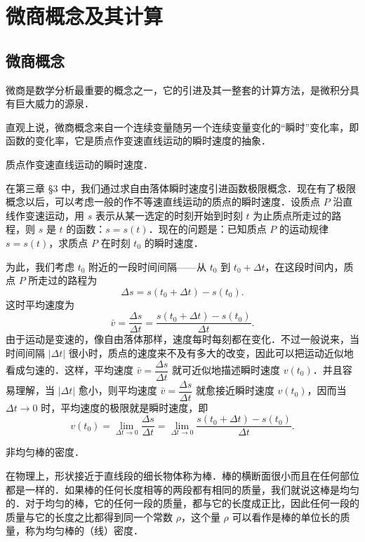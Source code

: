 \section{微商概念及其计算}\label{sec:4.1}

\subsection{微商概念}

微商是数学分析最重要的概念之一，它的引进及其一整套的计算方法，是微积分具有巨大威力的源泉．

直观上说，微商概念来自一个连续变量随另一个连续变量变化的``瞬时''变化率，即函数的变化率，它是质点作变速直线运动的瞬时速度的抽象．

\begin{example}\label{ex:4-1-1}
质点作变速直线运动的瞬时速度．
\end{example}

在第三章 §3 中，我们通过求自由落体瞬时速度引进函数极限概念．现在有了极限概念以后，可以考虑一般的作不等速直线运动的质点的瞬时速度．设质点 $P$ 沿直线作变速运动，用 $s$ 表示从某一选定的时刻开始到时刻 $t$ 为止质点所走过的路程，则 $s$ 是 $t$ 的函数：$s = s(t)$．现在的问题是：已知质点 $P$ 的运动规律 $s = s(t)$，求质点 $P$ 在时刻 $t_0$ 的瞬时速度．

为此，我们考虑 $t_0$ 附近的一段时间间隔——从 $t_0$ 到 $t_0 + \Delta t$，在这段时间内，质点 $P$ 所走过的路程为
\[
\Delta s = s\left(t_0+\Delta t\right) - s\left(t_0\right).
\]
这时平均速度为
\[
\bar{v} = \frac{\Delta s}{\Delta t} = \frac{s\left(t_0+\Delta t\right) - s\left(t_0\right)}{\Delta t}.
\]
由于运动是变速的，像自由落体那样，速度每时每刻都在变化．不过一般说来，当时间间隔 $\left|\Delta t\right|$ 很小时，质点的速度来不及有多大的改变，因此可以把运动近似地看成匀速的．这样，平均速度 $\bar{v} = \dfrac{\Delta s}{\Delta t}$ 就可近似地描述瞬时速度 $v(t_0)$．并且容易理解，当 $\left|\Delta t\right|$ 愈小，则平均速度 $\bar{v} = \dfrac{\Delta s}{\Delta t}$ 就愈接近瞬时速度 $v(t_0)$，因而当 $\Delta t \to 0$ 时，平均速度的极限就是瞬时速度，即
\[
v\left(t_0\right) = \lim_{\Delta t\to 0}\frac{\Delta s}{\Delta t} = \lim_{\Delta t\to 0}\frac{s\left(t_0+\Delta t\right) - s\left(t_0\right)}{\Delta t}.
\]

\begin{example}\label{ex:4-1-2}
非均匀棒的密度．
\end{example}

在物理上，形状接近于直线段的细长物体称为棒．棒的横断面很小而且在任何部位都是一样的．如果棒的任何长度相等的两段都有相同的质量，我们就说这棒是均匀的．对于均匀的棒，它的任何一段的质量，都与它的长度成正比，因此任何一段的质量与它的长度之比都得到同一个常数 $\rho$，这个量 $\rho$ 可以看作是棒的单位长的质量，称为均匀棒的（线）密度．

